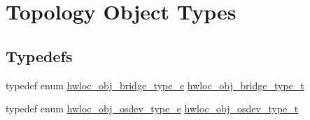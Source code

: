 \hypertarget{a00041}{
\section{Topology Object Types}
\label{a00041}
}
\subsection*{Typedefs}
\begin{DoxyCompactItemize}
\item 
typedef enum \hyperlink{a00041_ga48a4803c72574191d7ead1c62aaf9860}{hwloc\_\-obj\_\-bridge\_\-type\_\-e} \hyperlink{a00041_ga0a947e8c5adcc729b126bd09c01a0153}{hwloc\_\-obj\_\-bridge\_\-type\_\-t}
\item 
typedef enum \hyperlink{a00041_ga64f5d539df299c97ae80ce53fc4b56c0}{hwloc\_\-obj\_\-osdev\_\-type\_\-e} \hyperlink{a00041_ga90c1e82a60ba5871d07645169e636987}{hwloc\_\-obj\_\-osdev\_\-type\_\-t}
\end{DoxyCompactItemize}
